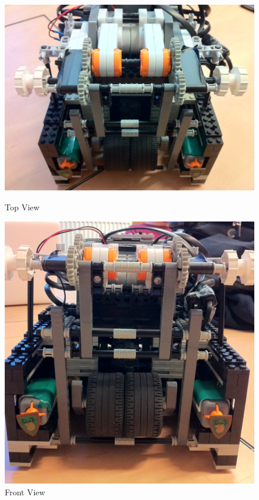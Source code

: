 \documentclass[12pt, a4paper, titlepage]{article}
\begin{document}
\begin{figure}[h]
\begin{minipage}[b]{0.5\linewidth}
\centering
\includegraphics[scale=0.8]{images/robot/topview.jpg}
\caption{Top View}
\label{fig:topview}
\end{minipage}
\hspace{0.5cm}
\begin{minipage}[b]{0.5\linewidth}
\centering
\includegraphics[scale=0.8]{images/robot/frontview.jpg}
\caption{Front View}
\label{fig:frontview}
\end{minipage}
\end{figure}
\end{document}
